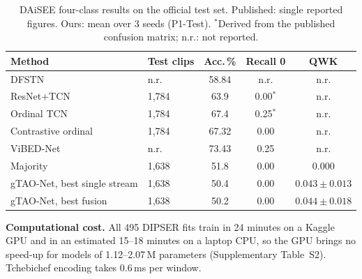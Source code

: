 \begin{table}[!htbp]
\centering
\caption{DAiSEE four-class results on the official test set. Published: single reported figures. Ours: mean over 3 seeds (P1-Test). $^\ast$Derived from the published confusion matrix; n.r.: not reported.}
\label{tab:comparison}
\footnotesize
\setlength{\tabcolsep}{3pt}
\begin{tabular}{llccc}
\toprule
Method & Test clips & Acc.\,\% & Recall 0 & QWK \\
\midrule
DFSTN~\cite{liao2021dfstn} & n.r. & 58.84 & n.r. & n.r. \\
ResNet+TCN~\cite{abedi2021resnettcn} & 1{,}784 & 63.9 & 0.00$^\ast$ & n.r. \\
Ordinal TCN~\cite{abedi2024affectordinal} & 1{,}784 & 67.4 & 0.25$^\ast$ & n.r. \\
Contrastive ordinal~\cite{abedi2025supervised} & 1{,}784 & 67.32 & 0.00 & n.r. \\
ViBED-Net~\cite{gothwal2025vibednet} & n.r. & 73.43 & 0.25 & n.r. \\
Majority & 1{,}638 & 51.8 & 0.00 & 0.000 \\
gTAO-Net, best single stream & 1{,}638 & 50.4 & 0.00 & $0.043\pm0.013$ \\
gTAO-Net, best fusion & 1{,}638 & 50.2 & 0.00 & $0.044\pm0.018$ \\
\bottomrule
\end{tabular}
\end{table}

\textbf{Computational cost.} All 495 DIPSER fits train in 24 minutes on a Kaggle GPU and in an estimated 15--18 minutes on a laptop CPU, so the GPU brings no speed-up for models of 1.12--2.07\,M parameters (Supplementary Table~S2). Tchebichef encoding takes 0.6\,ms per window.
